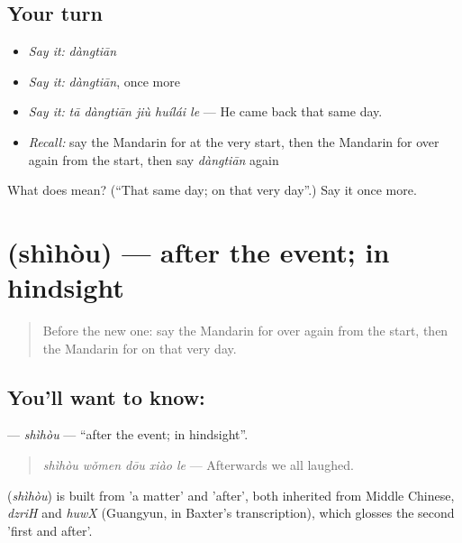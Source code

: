 \subsection*{Your turn}
\begin{itemize}
\raggedright
  \item \emph{Say it:} \emph{dàngtiān}
  \item \emph{Say it:} \emph{dàngtiān}, once more
  \item \emph{Say it:} \emph{tā dàngtiān jiù huílái le} — He came back that same day.
  \item \emph{Recall:} say the Mandarin for at the very start, then the Mandarin for over again from the start, then say \emph{dàngtiān} again
\end{itemize}

\begin{tcolorbox}[breakable,colback=teal!4,colframe=teal!35!black,title={Before you move on}]
What does  mean? (\textquotedblleft{}That same day; on that very day\textquotedblright{}.) Say it once more.
\end{tcolorbox}
\section[\texorpdfstring{\zh{事后} (shìhòu)}{事后 (shìhòu)}]{ (shìhòu) — after the event; in hindsight}

\label{lesson:ZH-C295-shihou}



\begin{quote}
Before the new one: say the Mandarin for over again from the start, then the Mandarin for on that very day.
\end{quote}

\subsection*{You'll want to know: }
\textbf{} — \emph{shìhòu} — \textquotedblleft{}after the event; in hindsight\textquotedblright{}.

\begin{quote}
\textbf{} \emph{shìhòu wǒmen dōu xiào le} — Afterwards we all laughed.
\end{quote}

\begin{cousinweb}
\textbf{} (\emph{shìhòu}) is built from  'a matter' and  'after', both inherited from Middle Chinese, \emph{dzriH} and \emph{huwX} (Guangyun, in Baxter's transcription), which glosses the second 'first and after'.
\end{cousinweb}

